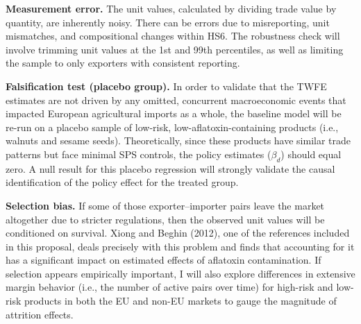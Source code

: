 \documentclass[12pt]{article}
\begin{document}
\textbf{Measurement error.} The unit values, calculated by dividing trade value by quantity, are inherently noisy. There can be errors due to misreporting, unit mismatches, and compositional changes within HS6. The robustness check will involve trimming unit values at the 1st and 99th percentiles, as well as limiting the sample to only exporters with consistent reporting.

\textbf{Falsification test (placebo group).} In order to validate that the TWFE estimates are not driven by any omitted, concurrent macroeconomic events that impacted European agricultural imports as a whole, the baseline model will be re-run on a placebo sample of low-risk, low-aflatoxin-containing products (i.e., walnuts and sesame seeds). Theoretically, since these products have similar trade patterns but face minimal SPS controls, the policy estimates ($\beta_d$) should equal zero. A null result for this placebo regression will strongly validate the causal identification of the policy effect for the treated group.

\textbf{Selection bias.} If some of those exporter–importer pairs leave the market altogether due to stricter regulations, then the observed unit values will be conditioned on survival. Xiong and Beghin (2012)\cite{xiong2012}, one of the references included in this proposal, deals precisely with this problem and finds that accounting for it has a significant impact on estimated effects of aflatoxin contamination. If selection appears empirically important, I will also explore differences in extensive margin behavior (i.e., the number of active pairs over time) for high-risk and low-risk products in both the EU and non-EU markets to gauge the magnitude of attrition effects.
\end{document}
